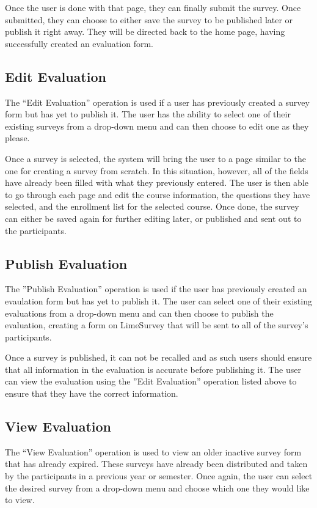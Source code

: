 \documentclass{article}
\begin{document}
Once the user is done with that page, they can finally submit the survey. Once submitted, they can choose to either save the survey to be published later or publish it right away. They will be directed back to the home page, having successfully created an evaluation form.

\subsection{Edit Evaluation}

The ``Edit Evaluation'' operation is used if a user has previously created a survey form but has yet to publish it. The user has the ability to select one of their existing surveys from a drop-down menu and can then choose to edit one as they please.

Once a survey is selected, the system will bring the user to a page similar to the one for creating a survey from scratch. In this situation, however, all of the fields have already been filled with what they previously entered. The user is then able to go through each page and edit the course information, the questions they have selected, and the enrollment list for the selected course. Once done, the survey can either be saved again for further editing later, or published and sent out to the participants.

\subsection{Publish Evaluation}

The ''Publish Evaluation'' operation is used if the user has previously created an evaulation form but has yet to publish it. The user can select one of their existing evaluations from a drop-down menu and can then choose to publish the evaluation, creating a form on LimeSurvey that will be sent to all of the survey's participants.

Once a survey is published, it can not be recalled and as such users should ensure that all information in the evaluation is accurate before publishing it.  The user can view the evaluation using the ''Edit Evaluation'' operation listed above to ensure that they have the correct information.

\subsection{View Evaluation}

The ``View Evaluation'' operation is used to view an older inactive survey form that has already expired. These surveys have already been distributed and taken by the participants in a previous year or semester. Once again, the user can select the desired survey from a drop-down menu and choose which one they would like to view.
\end{document}
